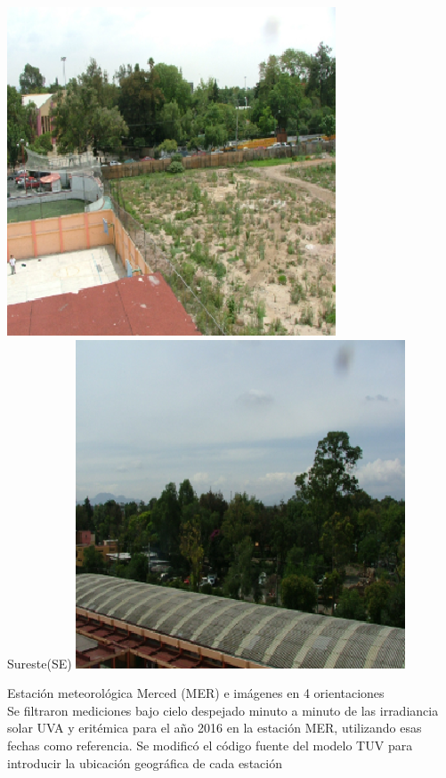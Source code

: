\documentclass{article}
\begin{document}
\begin{minipage}{0.53\linewidth}
\begin{minipage}{0.23\linewidth}
\includegraphics[scale=0.68]{images/noreste.eps}\\
\colorbox{ner}{\changefontsizes{9pt} \hspace{0.5cm} Sureste(SE)   \hspace{0.5cm}}
\includegraphics[scale=0.68]{images/sureste.eps}
\end{minipage}
\changefontsizes{9pt}
\textcolor{bl}{Estación meteorológica Merced (MER) e imágenes en 4 orientaciones}\\
\changefontsizes{12pt}
Se filtraron mediciones bajo cielo despejado minuto a minuto de las
irradiancia solar UVA y eritémica para el año 2016 en la estación MER,
utilizando esas fechas como referencia. Se modificó el código fuente del
modelo TUV para introducir la ubicación geográfica de cada estación

\end{minipage}
\end{document}
